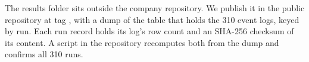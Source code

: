 The results folder sits outside the company repository. We publish it in the
public repository
\href{https://github.com/anikdewanje/master-thesis-submission}{}
at tag , with a dump of the  table that
holds the 310 event logs, keyed by run. Each run record holds its log's row
count and an SHA-256 checksum of its content. A script in the repository
recomputes both from the dump and confirms all 310 runs.

